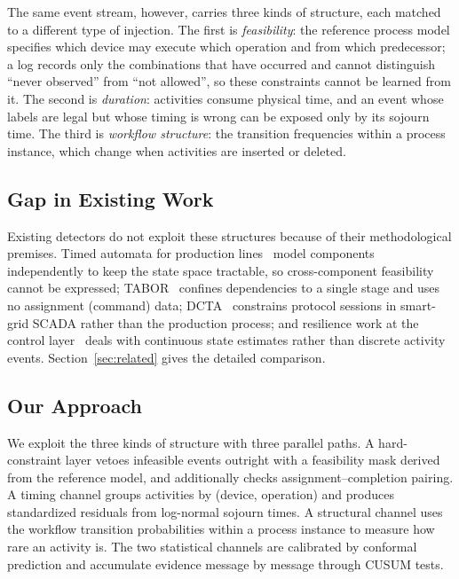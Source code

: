 \documentclass[manuscript,screen,review]{acmart}
\begin{document}
The same event stream, however, carries three kinds of structure, each matched to a different type of injection. The first is \emph{feasibility}: the reference process model specifies which device may execute which operation and from which predecessor; a log records only the combinations that have occurred and cannot distinguish ``never observed'' from ``not allowed'', so these constraints cannot be learned from it. The second is \emph{duration}: activities consume physical time, and an event whose labels are legal but whose timing is wrong can be exposed only by its sojourn time. The third is \emph{workflow structure}: the transition frequencies within a process instance, which change when activities are inserted or deleted.

\subsection{Gap in Existing Work}
\label{sec:intro_gap}

Existing detectors do not exploit these structures because of their methodological premises. Timed automata for production lines~\cite{maier2011timed} model components independently to keep the state space tractable, so cross-component feasibility cannot be expressed; TABOR~\cite{lin2018tabor} confines dependencies to a single stage and uses no assignment (command) data; DCTA~\cite{barsha2024dcta} constrains protocol sessions in smart-grid {SCADA} rather than the production process; and resilience work at the control layer~\cite{elsisi2023agv,mo2009replay} deals with continuous state estimates rather than discrete activity events. Section~\ref{sec:related} gives the detailed comparison.

\subsection{Our Approach}
\label{sec:intro_method}

We exploit the three kinds of structure with three parallel paths. A hard-constraint layer vetoes infeasible events outright with a feasibility mask derived from the reference model, and additionally checks assignment--completion pairing. A timing channel groups activities by (device, operation) and produces standardized residuals from log-normal sojourn times. A structural channel uses the workflow transition probabilities within a process instance to measure how rare an activity is. The two statistical channels are calibrated by conformal prediction and accumulate evidence message by message through {CUSUM} tests.
\end{document}
